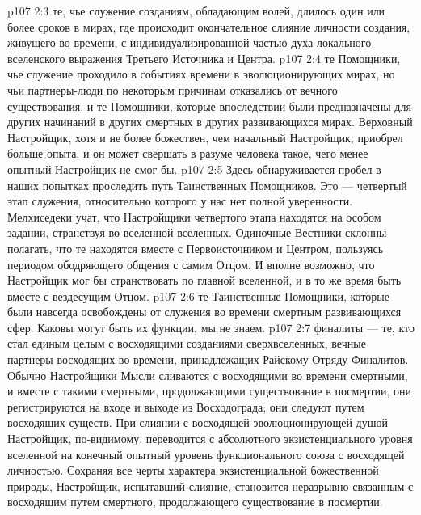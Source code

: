 \vs p107 2:3 \pc {}\bibnobreakspace {} те, чье служение созданиям, обладающим волей, длилось один или более сроков в мирах, где происходит окончательное слияние личности создания, живущего во времени, с индивидуализированной частью духа локального вселенского выражения Третьего Источника и Центра.
\vs p107 2:4 \pc {}\bibnobreakspace {} те Помощники, чье служение проходило в событиях времени в эволюционирующих мирах, но чьи партнеры\hyp{}люди по некоторым причинам отказались от вечного существования, и те Помощники, которые впоследствии были предназначены для других начинаний в других смертных в других развивающихся мирах. Верховный Настройщик, хотя и не более божествен, чем начальный Настройщик, приобрел больше опыта, и он может свершать в разуме человека такое, чего менее опытный Настройщик не смог бы.
\vs p107 2:5 \pc {}\bibnobreakspace {} Здесь обнаруживается пробел в наших попытках проследить путь Таинственных Помощников. Это --- четвертый этап служения, относительно которого у нас нет полной уверенности. Мелхиседеки учат, что Настройщики четвертого этапа находятся на особом задании, странствуя во вселенной вселенных. Одиночные Вестники склонны полагать, что те находятся вместе с Первоисточником и Центром, пользуясь периодом ободряющего общения с самим Отцом. И вполне возможно, что Настройщик мог бы странствовать по главной вселенной, и в то же время быть вместе с вездесущим Отцом.
\vs p107 2:6 \pc {}\bibnobreakspace {} те Таинственные Помощники, которые были навсегда освобождены от служения во времени смертным развивающихся сфер. Каковы могут быть их функции, мы не знаем.
\vs p107 2:7 \pc {}\bibnobreakspace {} финалиты --- те, кто стал единым целым с восходящими созданиями сверхвселенных, вечные партнеры восходящих во времени, принадлежащих Райскому Отряду Финалитов. Обычно Настройщики Мысли сливаются с восходящими во времени смертными, и вместе с такими смертными, продолжающими существование в посмертии, они регистрируются на входе и выходе из Восходограда; они следуют путем восходящих существ. При слиянии с восходящей эволюционирующей душой Настройщик, по\hyp{}видимому, переводится с абсолютного экзистенциального уровня вселенной на конечный опытный уровень функционального союза с восходящей личностью. Сохраняя все черты характера экзистенциальной божественной природы, Настройщик, испытавший слияние, становится неразрывно связанным с восходящим путем смертного, продолжающего существование в посмертии.
